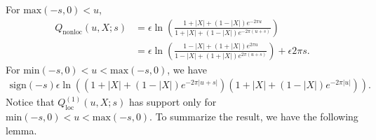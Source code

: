 \documentclass[a4paper,11pt]{article}
\theoremstyle{definition}
\begin{document}
For $\text{max}(-s,0)<u$,
\begin{align}    
    Q_{\text{nonloc}}(u,X;s) &= \epsilon\ln\left( \frac{1+|X| +(1-|X|)e^{-2\pi u}}{1+|X| +(1-|X|)e^{-2\pi(u+s)}}\right) \\
    &= \epsilon\ln\left( \frac{1-|X| + (1+|X|)e^{2\pi u} }{1-|X| + (1+|X|)e^{2\pi(u+s)} }\right) +\epsilon2\pi s.
\end{align}
For $\text{min}(-s,0)<u<\text{max}(-s,0)$, we have
\begin{align}
    \text{sign}(-s)\epsilon\ln\left(({1+|X| +(1-|X|)e^{-2\pi|u+s|}})({1+|X| +(1-|X|)e^{-2\pi|u|}})\right).
\end{align}
Notice that $Q^{(1)}_{\text{loc}}(u,X;s)$ has support only for $\text{min}(-s,0)<u<\text{max}(-s,0)$.
To summarize the result, we have the following lemma.
\end{document}
